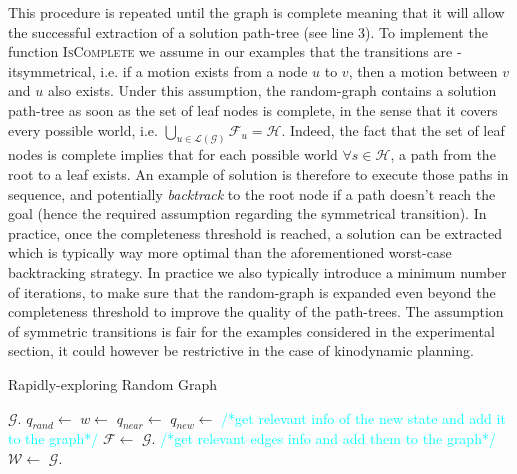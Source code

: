 \documentclass[letterpaper, 10 pt, conference]{ieeeconf}  %
\begin{document}
This procedure is repeated until the graph is complete meaning that it will allow the successful extraction of a solution path-tree (see line 3). To implement the function \textsc{IsComplete} we assume in our examples that the transitions are \text-it{symmetrical}, i.e. if a motion exists from a node $u$ to $v$, then a motion between $v$ and $u$ also exists. Under this assumption, the random-graph contains a solution path-tree as soon as the set of leaf nodes is complete, in the sense that it covers every possible world, i.e.  $\bigcup_{u \in \mathcal{\mathcal{L}(G)}} \mathcal{F}_u = \mathcal{H}$. Indeed, the fact that the set of leaf nodes is complete implies that for each possible world $\forall s \in \mathcal{H}$, a path from the root to a leaf exists. An example of solution is therefore to execute those paths in sequence, and  potentially \textit{backtrack} to the root node if a path doesn't reach the goal (hence the required assumption regarding the symmetrical transition). In practice, once the completeness threshold is reached, a solution can be extracted which is typically way more optimal than the aforementioned worst-case backtracking strategy. In practice we also typically introduce a minimum number of iterations, to make sure that the random-graph is expanded even beyond the completeness threshold to improve the quality of the path-trees. The assumption of symmetric transitions is fair for the examples considered in the experimental section, it could however be restrictive in the case of kinodynamic planning. %

\begin{algorithm}[H]
\caption{Rapidly-exploring Random Graph}
\label{alg:rrg}
\begin{algorithmic}[1]
	\State $\mathcal{G}$.
    	\State $q_{rand} \gets$ 
    	\State $w \gets$ 
    	\State $q_{near} \gets$ 
    	\State $q_{new} \gets$ 
    	\State \textcolor{cyan}{\footnotesize/*get relevant info of the new state and add it to the graph*/}
    	    \State $\mathcal{F} \gets$ 
    		\State $\mathcal{G}$.
    		\State \textcolor{cyan}{\footnotesize/*get relevant edges info and add them to the graph*/}
    			\State $\mathcal{W} \gets$ 
    				\State $\mathcal{G}$.
    			\EndIf
    		\EndFor
    	\EndIf
    \EndWhile
\EndFunction
\Statex
\end{algorithmic}
\end{algorithm}
\end{document}
